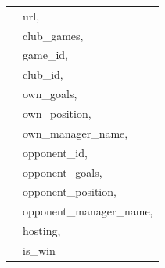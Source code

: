 \documentclass{Configuration_Files/PoliMi3i_thesis}
\begin{document}
\begin{tabular}{|l|p{13cm}|}
	                      & url,                                      \\
	                      & club\_games,                              \\
	                      & game\_id,                                 \\
	                      & club\_id,                                 \\
	                      & own\_goals,                               \\
	                      & own\_position,                            \\
	                      & own\_manager\_name,                       \\
	                      & opponent\_id,                             \\
	                      & opponent\_goals,                          \\
	                      & opponent\_position,                       \\
	                      & opponent\_manager\_name,                  \\
	                      & hosting,                                  \\
	                      & is\_win                                   \\
	\hline
\end{tabular}
\end{document}
